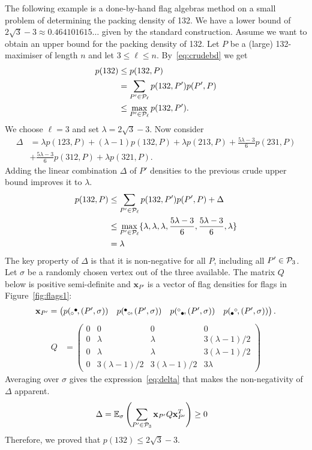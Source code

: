 The following example is a done-by-hand flag algebras method on a small problem of determining the packing density of 132. We have a lower bound of $2\sqrt{3}-3 \approx 0.464101615\ldots$ given by the standard construction. Assume we want to obtain an upper bound for the packing density of 132. Let $P$ be a (large) 132-maximiser of length $n$ and let $3 \leq \ell \leq n$. By~\eqref{eq:crudebd} we get
\begin{align*}
p(132) &\leq p(132, P)\\
  &= \sum_{P' \in \P_\ell}p(132,P')p(P',P)\\
       &\leq \max_{P' \in \P_\ell} p(132,P').
\end{align*}
We choose $\ell = 3$ and set $\lambda = 2\sqrt{3}-3$. Now consider 
\begin{align*}
\Delta &= \lambda p(123,P) + (\lambda-1)p(132,P) + \lambda p(213,P) + \frac{5\lambda-3}{6}p(231,P)\\
       &+ \frac{5\lambda-3}{6}p(312,P) + \lambda p(321,P).
\end{align*}
Adding the linear combination $\Delta$ of $P'$ densities to the previous crude upper bound improves it to $\lambda$.
\begin{align*}
p(132,P) &\leq \sum_{P' \in \P_\ell}p(132,P')p(P',P) + \Delta\\
&\leq \max_{P' \in \P_\ell}\{\lambda, \lambda,\lambda, \frac{5\lambda-3}{6}, \frac{5\lambda-3}{6},\lambda\}\\
&= \lambda
\end{align*}
The key property of $\Delta$ is that it is non-negative for all $P$, including all $P' \in \P_3$. Let $\sigma$ be a randomly chosen vertex out of the three available. The matrix $Q$ below is positive semi-definite and $\mathbf{x}_{P'}$ is a vector of flag densities for flags in Figure~\ref{fig:flags1}: $$\mathbf{x}_{P'} = \begin{pmatrix}p(\tauab,(P',\sigma))& p(\batau,(P',\sigma))& p(\tauba,(P',\sigma)) & p(\abtau,(P',\sigma))\end{pmatrix}.$$
\begin{align}
Q &= \begin{pmatrix}0 & 0 & 0 & 0 \\ 0 & \lambda & \lambda & 3(\lambda-1)/2\\0 & \lambda & \lambda & 3(\lambda-1)/2\\ 0 & 3(\lambda-1)/2 & 3(\lambda-1)/2 & 3\lambda  \end{pmatrix}
\label{eq:Q}
\end{align}
Averaging over $\sigma$ gives the expression~\eqref{eq:delta} that makes the non-negativity of $\Delta$ apparent.
\begin{align}
\Delta &= \mathbb{E}_\sigma\left(\sum_{P' \in \P_3}\mathbf{x}_{P'}Q\mathbf{x}_{P'}^T\right) \geq 0 \label{eq:delta}
\end{align}
Therefore, we proved that $p(132) \leq 2\sqrt{3}-3$. 

